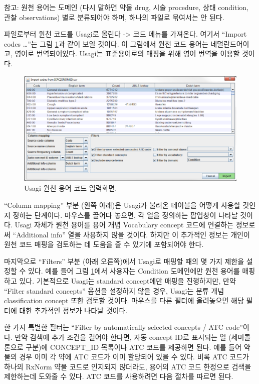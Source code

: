 \documentclass[10.5pt]{book}
\theoremstyle{definition}
\theoremstyle{definition}
\theoremstyle{definition}
\theoremstyle{remark}
\begin{document}
참고: 원천 용어는 도메인 (다시 말하면 약물 drug, 시술 procedure, 상태
condition, 관찰 observations) 별로 분류되어야 하며, 하나의 파일로
묶여서는 안 된다.

파일로부터 원천 코드를 Usagi로 올린다 -\textgreater{} 코드 메뉴를
가져온다. 여기서 ``Import codes \ldots{}''는 그림
\ref{fig:usagiImport}과 같이 보일 것이다. 이 그림에서 원천 코드 용어는
네덜란드어이고, 영어로 번역되어있다. Usagi는 표준용어로의 매핑을 위해
영어 번역을 이용할 것이다.

\begin{figure}

{\centering \includegraphics[width=1\linewidth]{images/ExtractTransformLoad/usagiImport} 

}

\caption{Usagi 원천 용어 코드 입력화면.}\label{fig:usagiImport}
\end{figure}

``Column mapping'' 부분 (왼쪽 아래)은 Usagi가 불러온 테이블을 어떻게
사용할 것인지 정하는 단계이다. 마우스를 끌어다 놓으면, 각 열을 정의하는
팝업창이 나타날 것이다. Usagi 자체가 원천 용어를 용어 개념 Vocabulary
concept 코드에 연결하는 정보로써 ``Additional info'' 열을 사용하지 않을
것이다. 하지만 이 추가적인 정보는 개인이 원천 코드 매핑을 검토하는 데
도움을 줄 수 있기에 포함되어야 한다.

마지막으로 ``Filters'' 부분 (아래 오른쪽)에서 Usagi로 매핑할 때의 몇
가지 제한을 설정할 수 있다. 예를 들어 그림 \ref{fig:usagiImport}에서
사용자는 Condition 도메인에만 원천 용어를 매핑하고 있다. 기본적으로
Usagi는 standard concept에만 매핑을 진행하지만, 만약 ``Filter standard
concepts'' 옵션을 설정하지 않을 경우, Usagi는 분류 개념 classification
concept 또한 검토할 것이다. 마우스를 다른 필터에 올려놓으면 해당 필터에
대한 추가적인 정보가 나타날 것이다.

한 가지 특별한 필터는 ``Filter by automatically selected concepts / ATC
code''이다. 만약 검색에 추가 조건을 걸어야 한다면, 자동 concept ID로
표시되는 열 (세미콜론으로 구분)에 CONCEPT\_ID 목록이나 ATC 코드를
제공하면 된다. 예를 들어 약물의 경우 이미 각 약에 ATC 코드가 이미
할당되어 있을 수 있다. 비록 ATC 코드가 하나의 RxNorm 약물 코드로
인지되지 않더라도, 용어의 ATC 코드 한정으로 검색을 제한하는데 도와줄 수
있다. ATC 코드를 사용하려면 다음 절차를 따르면 된다.
\end{document}
